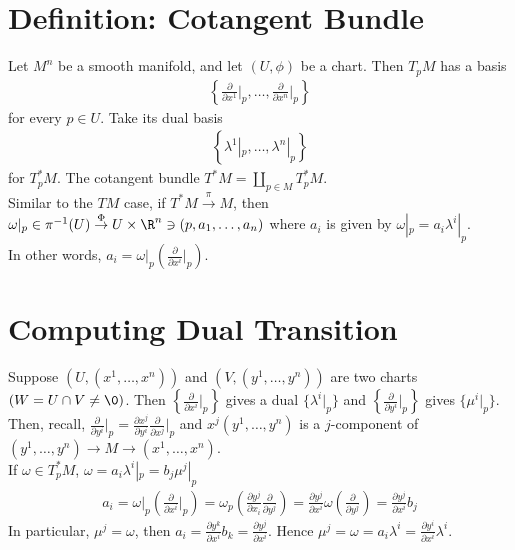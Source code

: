\documentclass[11pt]{article}
\begin{document}
\section*{Definition: Cotangent Bundle}
\label{sec:org8b99905}
Let \(M^{n}\) be a smooth manifold, and let \((U,\phi)\) be a chart. Then \(T_{p}M\) has a basis\\
\begin{align*}
  \left\{ \frac{\partial}{\partial x^{1}}\Big|_{p},\ldots,\frac{\partial}{\partial x^{n}}\Big|_{p} \right\}
\end{align*}
for every \(p\in U\). Take its dual basis\\
\begin{align*}
  \left\{ \lambda^{1}|_{p},\ldots,\lambda^{n}|_{p} \right\}
\end{align*}
for \(T^{*}_{p}M\). The cotangent bundle \(T^{*}M=\coprod_{p\in M}T_{p}^{*}M\).\\
Similar to the \(TM\) case, if \(T^{*}M\overset{\pi}{\to}M\), then \(\omega|_{p}\in\pi^{-1}(U)\overset{\Phi}{\to}U\times\R^{n}\ni(p,a_{1},\ldots,a_{n})\) where \(a_{i}\) is given by \(\omega|_{p}=a_{i}\lambda^{i}|_{p}\).\\
In other words, \(a_{i}=\omega|_{p}\left( \frac{\partial}{\partial x^{i}}\Big|_{p} \right)\).\\
\section*{Computing Dual Transition}
\label{sec:org8af90d6}
Suppose \((U,(x^{1},\ldots,x^{n}))\) and \((V,(y^{1},\ldots,y^{n}))\) are two charts \((W=U\cap V\neq\0)\). Then \(\left\{ \frac{\partial}{\partial x^{i}}\Big|_{p} \right\}\) gives a dual \(\{\lambda^{i}|_{p}\}\) and \(\left\{ \frac{\partial}{\partial y^{i}}\Big|_{p} \right\}\) gives \(\{\mu^{i}|_{p}\}\).\\
Then, recall, \(\frac{\partial}{\partial y^{i}}\Big|_{p}=\frac{\partial x^{j}}{\partial y^{i}}\frac{\partial}{\partial x^{j}}\Big|_{p}\) and \(x^{j}(y^{1},\ldots,y^{n})\) is a \(j\)-component of \((y^{1},\ldots,y^{n})\to M\to(x^{1},\ldots,x^{n})\).\\
If \(\omega\in T^{*}_{p}M\), \(\omega=a_{i}\lambda^{i}|_{p}=b_{j}\mu^{j}|_{p}\)\\
\begin{align*}
  a_{i}
  =\omega|_{p}\left( \frac{\partial}{\partial x^{i}}\Big|_{p} \right)
  =\omega_{p}\left( \frac{\partial y^{j}}{\partial x_{i}}\frac{\partial}{\partial y^{j}} \right)
  =\frac{\partial y^{j}}{\partial x^{i}}\omega\left( \frac{\partial}{\partial y^{j}} \right)
  =\frac{\partial y^{j}}{\partial x^{i}}b_{j}
\end{align*}
In particular, \(\mu^{j}=\omega\), then \(a_{i}=\frac{\partial y^{k}}{\partial x^{i}}b_{k}=\frac{\partial y^{j}}{\partial x^{i}}\). Hence \(\mu^{j}=\omega=a_{i}\lambda^{i}=\frac{\partial y^{i}}{\partial x^{i}}\lambda^{i}\).\\
\end{document}
